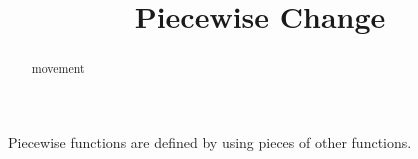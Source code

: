 \documentclass{ximera}
\title{Piecewise Change}
\begin{document}
\begin{abstract}
movement
\end{abstract}
\maketitle



Piecewise functions are defined by using pieces of other functions.
\end{document}
